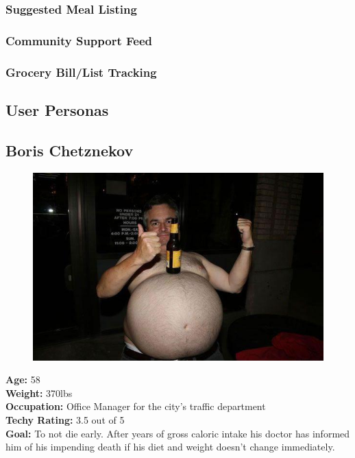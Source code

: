 \documentclass[a4paper,12pt]{article}
\begin{document}
\subsubsection{Suggested Meal Listing}
\subsubsection{Community Support Feed}
\subsubsection{Grocery Bill/List Tracking}
\newpage 
\begin{appendices}
\section{User Personas}
\subsection{Boris Chetznekov}
\begin{figure}
  \begin{center}
	\includegraphics[scale=0.3]{Boris.jpg}\\
  \end{center}
\end{figure}
\textbf{Age:} 58\\
\textbf{Weight:} 370lbs\\
\textbf{Occupation:} Office Manager for the city's traffic department\\
\textbf{Techy Rating:} 3.5 out of 5\\
\textbf{Goal:} To not die early.  After years of gross caloric intake his doctor has informed him of his impending death if his diet and weight doesn't change immediately.\\


\end{appendices}
\end{document}
